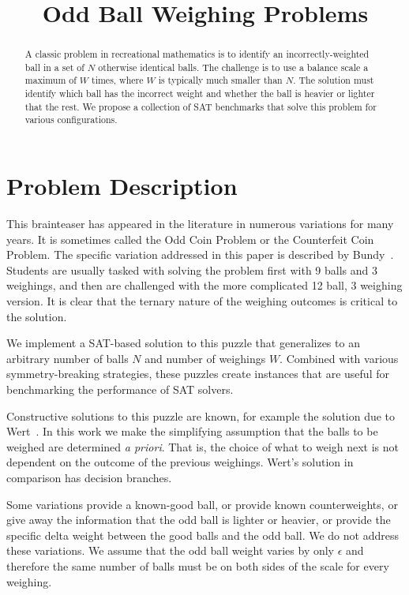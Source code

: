 \documentclass[conference]{IEEEtran}
\begin{document}
\title{Odd Ball Weighing Problems}

\author{
}

\maketitle

\begin{abstract}
A classic problem in recreational mathematics is to identify an incorrectly-weighted ball in a set of $N$ otherwise identical balls.
The challenge is to use a balance scale a maximum of $W$ times, where $W$ is typically much smaller than $N$.
The solution must identify which ball has the incorrect weight and whether the ball is heavier or lighter that the rest.
We propose a collection of SAT benchmarks that solve this problem for various configurations.
\end{abstract}

\section{Problem Description}

This brainteaser has appeared in the literature in numerous variations for many years.
It is sometimes called the Odd Coin Problem or the Counterfeit Coin Problem.
The specific variation addressed in this paper is described by Bundy~\cite{b2}.
Students are usually tasked with solving the problem first with 9 balls and 3 weighings,
and then are challenged with the more complicated 12 ball, 3 weighing version.
It is clear that the ternary nature of the weighing outcomes is critical to the solution.

We implement a SAT-based solution to this puzzle that generalizes to an arbitrary number of balls $N$ and number of weighings $W$.
Combined with various symmetry-breaking strategies, these puzzles create instances that are useful for benchmarking
the performance of SAT solvers.

Constructive solutions to this puzzle are known, for example the solution due to Wert~\cite{b3}.
In this work we make the simplifying assumption that the balls to be weighed are determined \emph{a priori}. That is,
the choice of what to weigh next is not dependent on the outcome of the previous weighings.
Wert's solution in comparison has decision branches.

Some variations provide a known-good ball, or provide known counterweights, or give away the information that the odd ball
is lighter or heavier, or provide the specific delta weight between the good balls and the odd ball.
We do not address these variations.
We assume that the odd ball weight varies by only $\epsilon$ and therefore the same number of balls must be on both sides of the scale
for every weighing.
\end{document}
